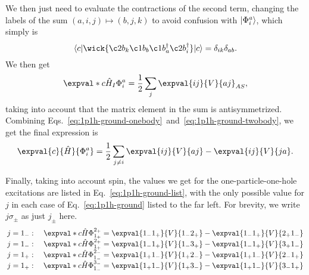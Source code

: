 We then just need to evaluate the contractions of the second term, changing the labels of the sum $(a, i, j) \mapsto (b, j, k)$ to avoid confusion with $\lvert\Phi_i^a\rangle$, which simply is
\begin{equation*}
    \langle c \vert
    \wick{
        \c2 b_k \c1 b_b \c1 b_a^\dagger \c2 b_i^\dagger
    }
    \vert c \rangle
    = \delta_{ik} \delta_{ab}.
\end{equation*}
We then get
\begin{equation}\label{eq:1p1h-ground-twobody}
    \expval*{c}{\hat{H}_I}{\Phi_i^a} = \frac{1}{2} \sum_{j} \expval{i j}{V}{a j}_{AS},
\end{equation}
taking into account that the matrix element in the sum is antisymmetrized.
Combining Eqs.~\eqref{eq:1p1h-ground-onebody}~and~\eqref{eq:1p1h-ground-twobody}, we get the final expression is
\begin{equation}\label{eq:1p1h-ground}
    \expval{c}{\hat{H}}{\Phi_i^a} = \frac{1}{2} \sum_{j \neq i} \expval{i j}{V}{a j} - \expval{i j}{V}{j a}.
\end{equation}

Finally, taking into account spin, the values we get for the one-particle-one-hole excitations are listed in Eq.~\eqref{eq:1p1h-ground-list}, with the only possible value for $j$ in each case of Eq.~\eqref{eq:1p1h-ground} listed to the far left.
For brevity, we write $j\sigma_{\pm}$ as just $j_{\pm}$ here.
\begin{equation}\label{eq:1p1h-ground-list}
    \arraycolsep=1.4pt %
    \begin{array}{crcl}
        j = 1_{-}: \quad
        & \expval*{c}{\hat{H}}{\Phi_{1_{+}}^{2_{+}}}
        & = &
        \expval{1_{-} 1_{+}}{V}{1_{-} 2_{+}} - \expval{1_{-} 1_{+}}{V}{2_{+} 1_{-}} \\

        j = 1_{-}: \quad
        & \expval*{c}{\hat{H}}{\Phi_{1_{+}}^{2_{+}}}
        & = &
        \expval{1_{-} 1_{+}}{V}{1_{-} 3_{+}} - \expval{1_{-} 1_{+}}{V}{3_{+} 1_{-}} \\

        j = 1_{+}: \quad
        & \expval*{c}{\hat{H}}{\Phi_{1_{-}}^{2_{-}}}
        & = &
        \expval{1_{+} 1_{-}}{V}{1_{+} 2_{-}} - \expval{1_{+} 1_{-}}{V}{2_{-} 1_{+}} \\

        j = 1_{+}: \quad
        & \expval*{c}{\hat{H}}{\Phi_{1_{-}}^{3_{-}}}
        & = &
        \expval{1_{+} 1_{-}}{V}{1_{+} 3_{-}} - \expval{1_{+} 1_{-}}{V}{3_{-} 1_{+}}
    \end{array}
\end{equation}

